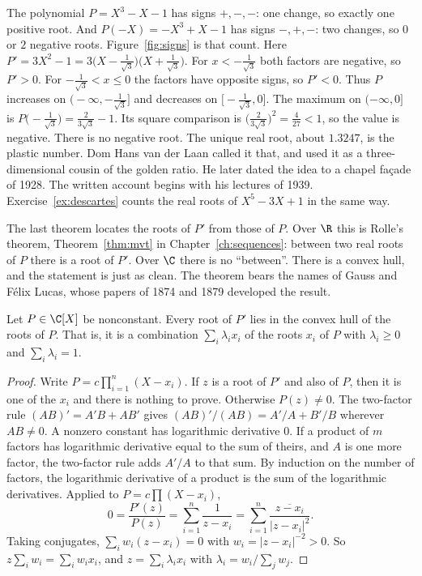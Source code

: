 \begin{examplex}
The polynomial $P=X^3-X-1$ has signs $+,-,-$: one change, so exactly one positive root. And $P(-X)=-X^3+X-1$ has signs $-,+,-$: two changes, so $0$ or $2$ negative roots. Figure~\ref{fig:signs} is that count. Here $P'=3X^2-1=3\bigl(X-\frac1{\sqrt3}\bigr)\bigl(X+\frac1{\sqrt3}\bigr)$. For $x<-\frac1{\sqrt3}$ both factors are negative, so $P'>0$. For $-\frac1{\sqrt3}<x\le 0$ the factors have opposite signs, so $P'<0$. Thus $P$ increases on $\bigl(-\infty,-\frac1{\sqrt3}\bigr]$ and decreases on $\bigl[-\frac1{\sqrt3},0\bigr]$. The maximum on $(-\infty,0]$ is $P\bigl(-\frac1{\sqrt3}\bigr)=\frac2{3\sqrt3}-1$. Its square comparison is $\bigl(\frac2{3\sqrt3}\bigr)^2=\frac4{27}<1$, so the value is negative. There is no negative root. The unique real root, about $1.3247$, is the plastic number. Dom Hans van der Laan called it that, and used it as a three-dimensional cousin of the golden ratio. He later dated the idea to a chapel façade of 1928. The written account begins with his lectures of 1939. Exercise~\ref{ex:descartes} counts the real roots of $X^5-3X+1$ in the same way.
\end{examplex}

The last theorem locates the roots of $P'$ from those of $P$. Over $\R$ this is Rolle's theorem, Theorem~\ref{thm:mvt} in Chapter~\ref{ch:sequences}: between two real roots of $P$ there is a root of $P'$. Over $\C$ there is no ``between''. There is a convex hull, and the statement is just as clean. The theorem bears the names of Gauss and F\'elix Lucas, whose papers of 1874 and 1879 developed the result.

\begin{theorem}\label{thm:gausslucas}
Let $P\in\C[X]$ be nonconstant. Every root of $P'$ lies in the convex hull of the roots of $P$. That is, it is a combination $\sum_i\lambda_ix_i$ of the roots $x_i$ of $P$ with $\lambda_i\ge0$ and $\sum_i\lambda_i=1$.
\end{theorem}
\begin{proof}
Write $P=c\prod_{i=1}^n(X-x_i)$. If $z$ is a root of $P'$ and also of $P$, then it is one of the $x_i$ and there is nothing to prove. Otherwise $P(z)\ne0$. The two-factor rule $(AB)'=A'B+AB'$ gives $(AB)'/(AB)=A'/A+B'/B$ wherever $AB\ne0$. A nonzero constant has logarithmic derivative $0$. If a product of $m$ factors has logarithmic derivative equal to the sum of theirs, and $A$ is one more factor, the two-factor rule adds $A'/A$ to that sum. By induction on the number of factors, the logarithmic derivative of a product is the sum of the logarithmic derivatives. Applied to $P=c\prod(X-x_i)$,
\[
0=\frac{P'(z)}{P(z)}=\sum_{i=1}^n\frac1{z-x_i}=\sum_{i=1}^n\frac{\overline{z-x_i}}{|z-x_i|^2}.
\]
Taking conjugates, $\sum_iw_i(z-x_i)=0$ with $w_i=|z-x_i|^{-2}>0$. So $z\sum_iw_i=\sum_iw_ix_i$, and $z=\sum_i\lambda_ix_i$ with $\lambda_i=w_i\big/\sum_jw_j$.
\end{proof}


